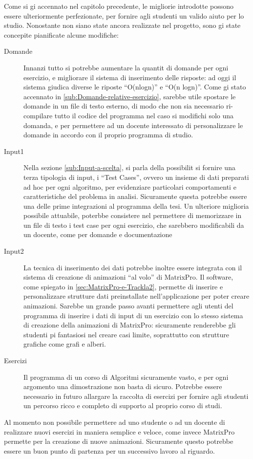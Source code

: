 Come si  gi accennato nel capitolo precedente, le migliorie introdotte
possono essere ulteriormente perfezionate, per fornire agli studenti
un valido aiuto per lo studio. Nonostante non siano state ancora realizzate
nel progetto, sono gi state concepite pianificate alcune modifiche:
\begin{description}
\item [{Domande}] Innanzi tutto si potrebbe aumentare la quantit di domande
per ogni esercizio, e migliorare il sistema di inserimento delle risposte:
ad oggi il sistema giudica diverse le riposte {}``O(nlogn)'' e {}``O(n
logn)''. Come  gi stato accennato in \ref{sub:Domande-relative-esercizio},
sarebbe utile spostare le domande in un file di testo esterno, di
modo che non sia necessario ri-compilare tutto il codice del programma
nel caso si modifichi solo una domanda, e per permettere ad un docente
interessato di personalizzare le domande in accordo con il proprio
programma di studio.
\item [{Input1}] Nella sezione \ref{sub:Input-a-scelta}, si parla della
possibilit si fornire una terza tipologia di input, i {}``Test Cases'',
ovvero un insieme di dati preparati ad hoc per ogni algoritmo, per
evidenziare particolari comportamenti e caratteristiche del problema
in analisi. Sicuramente questa potrebbe essere una delle prime integrazioni
al programma della tesi. Un ulteriore miglioria possibile attuabile,
poterbbe consistere nel permettere di memorizzare in un file di testo
i test case per ogni esercizio, che sarebbero modificabili da un docente,
come per domande e documentazione
\item [{Input2}] La tecnica di inserimento dei dati potrebbe inoltre essere
integrata con il sistema di creazione di animazioni {}``al volo''
di MatrixPro. Il software, come spiegato in \ref{sec:MatrixPro-e-Trackla2},
permette di inserire e personalizzare strutture dati preinstallate
nell'applicazione per poter creare animazioni. Sarebbe un grande passo
avanti permettere agli utenti del programma di inserire i dati di
input di un esercizio con lo stesso sistema di creazione della animazioni
di MatrixPro: sicuramente renderebbe gli studenti pi fantasiosi nel
creare casi limite, soprattutto con strutture grafiche come grafi
e alberi.
\item [{Esercizi}] Il programma di un corso di Algoritmi  sicuramente
vasto, e per ogni argomento una dimostrazione non basta di sicuro.
Potrebbe essere necessario in futuro allargare la raccolta di esercizi
per fornire agli studenti un percorso ricco e completo di supporto
al proprio corso di studi. 
\end{description}
Al momento non  possibile permettere ad uno studente o ad un docente
di realizzare nuovi esercizi in maniera semplice e veloce, come invece
MatrixPro permette per la creazione di nuove animazioni. Sicuramente
questo potrebbe essere un buon punto di partenza per un successivo
lavoro al riguardo.


